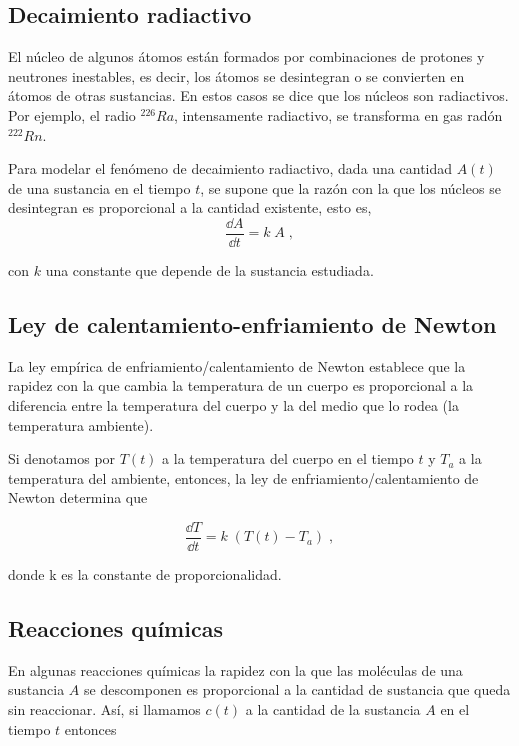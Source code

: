 \subsection{Decaimiento radiactivo}    


El núcleo de algunos átomos están formados por combinaciones de protones y neutrones inestables, es decir, los átomos se desintegran o se convierten en átomos de otras sustancias. En estos casos se dice que los núcleos son radiactivos. Por ejemplo, el radio $^{ 226 }{ Ra }$, intensamente radiactivo, se transforma en gas radón $^{ 222 }{ Rn }$.
 
Para modelar el fenómeno de decaimiento radiactivo, dada una cantidad $A(t)$ de una sustancia en el tiempo $t$, se supone que la razón con la que los núcleos se desintegran es proporcional a la cantidad existente, esto es, 
\begin{equation*}
	\dfrac {\dd A}{\dd t}= k\; A\; ,
\end{equation*}

con $k$ una constante que depende de la sustancia estudiada. 

\subsection{Ley de calentamiento-enfriamiento de Newton}
  
La ley empírica de enfriamiento/calentamiento de Newton establece que la rapidez con la que cambia la temperatura de un cuerpo es proporcional a la diferencia entre la temperatura del cuerpo y la del medio que lo rodea (la temperatura ambiente). 
 
Si denotamos por $T(t)$ a la temperatura del cuerpo en el tiempo $t$ y $T_a$ a la temperatura del ambiente, entonces, la ley de enfriamiento/calentamiento de Newton determina que 
  
  \begin{equation*}
  	\dfrac {\dd T}{\dd t}= k\; \left( T(t)-T_a \right)\; ,
  \end{equation*}
  
donde k es la constante de proporcionalidad. 

\subsection{Reacciones químicas} 
  
En algunas reacciones químicas la rapidez con la que las moléculas de una sustancia $A$ se descomponen es proporcional a la cantidad de sustancia que queda sin reaccionar. Así, si llamamos $c(t)$ a la cantidad de la sustancia $A$ en el tiempo $t$ entonces 
  
